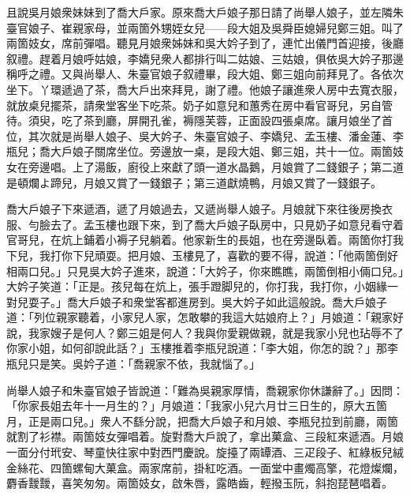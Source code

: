 且說吳月娘衆妹妹到了喬大戶家。原來喬大戶娘子那日請了尚舉人娘子，並左隣朱臺官娘子、崔親家母，並兩箇外甥姪女兒——段大姐及吳舜臣媳婦兒鄭三姐。叫了兩箇妓女，席前彈唱。聽見月娘衆姊妹和吳大妗子到了，連忙出儀門首迎接，後廳叙禮。趕着月娘呼姑娘，李嬌兒衆人都排行叫二姑娘、三姑娘，俱依吳大妗子那邊稱呼之禮。又與尚舉人、朱臺官娘子叙禮畢，段大姐、鄭三姐向前拜見了。各依次坐下。丫環遞過了茶，喬大戶出來拜見，謝了禮。他娘子讓進衆人房中去寬衣服，就放桌兒擺茶，請衆堂客坐下吃茶。奶子如意兒和蕙秀在房中看官哥兒，另自管待。須臾，吃了茶到廳，屏開孔雀，褥隱芙蓉，正面設四張桌席。讓月娘坐了首位，其次就是尚舉人娘子、吳大妗子、朱臺官娘子、李嬌兒、孟玉樓、潘金蓮、李瓶兒；喬大戶娘子關席坐位。旁邊放一桌，是段大姐、鄭三姐，共十一位。兩箇妓女在旁邊唱。上了湯飯，廚役上來獻了頭一道水晶鵝，月娘賞了二錢銀子；第二道是頓爛よ蹄兒，月娘又賞了一錢銀子；第三道獻燒鴨，月娘又賞了一錢銀子。

喬大戶娘子下來遞酒，遞了月娘過去，又遞尚舉人娘子。月娘就下來往後房換衣服、勻臉去了。孟玉樓也跟下來，到了喬大戶娘子臥房中，只見奶子如意兒看守着官哥兒，在炕上鋪着小褥子兒躺着。他家新生的長姐，也在旁邊臥着。兩箇你打我下兒，我打你下兒頑耍。{}把月娘、玉樓見了，喜歡的要不得，說道：「他兩箇倒好相兩口兒。」只見吳大妗子進來，說道：「大妗子，你來瞧瞧，兩箇倒相小倆口兒。」大妗子笑道：「正是。孩兒每在炕上，張手蹬脚兒的，你打我，我打你，小姻緣一對兒耍子。」喬大戶娘子和衆堂客都進房到。吳大妗子如此這般說。喬大戶娘子道：「列位親家聽着，小家兒人家，怎敢攀的我這大姑娘府上？」月娘道：「親家好說，我家嫂子是何人？鄭三姐是何人？我與你愛親做親，就是我家小兒也玷辱不了你家小姐，如何卻說此話？」玉樓推着李瓶兒說道：「李大姐，你怎的說？」那李瓶兒只是笑。{}吳妗子道：「喬親家不依，我就惱了。」

尚舉人娘子和朱臺官娘子皆說道：「難為吳親家厚情，喬親家你休謙辭了。」因問：「你家長姐去年十一月生的？」月娘道：「我家小兒六月廿三日生的，原大五箇月，正是兩口兒。」衆人不繇分說，把喬大戶娘子和月娘、李瓶兒拉到前廳，兩箇就割了衫襟。兩箇妓女彈唱着。旋對喬大戶說了，拿出菓盒、三段紅來遞酒。月娘一面分付玳安、琴童快往家中對西門慶說。旋擡了兩罈酒、三疋段子、紅綠板兒絨金絲花、四箇螺甸大菓盒。兩家席前，掛紅吃酒。一面堂中畫燭高擎，花燈燦爛，麝香靉靉，喜笑匆匆。兩箇妓女，啟朱唇，露皓齒，輕撥玉阮，斜抱琵琶唱着。

